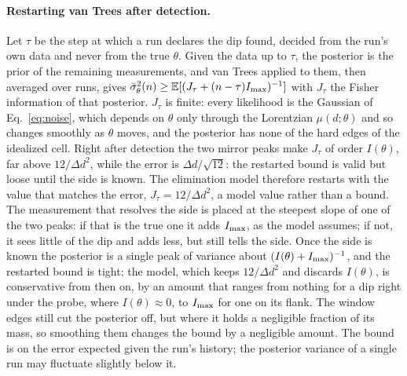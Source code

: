 \paragraph{Restarting van Trees after detection.} Let $\tau$ be the step at which a run declares the dip found,
decided from the run's own data and never from the true $\theta$. Given the data up to $\tau$, the posterior is the
prior of the remaining measurements, and van Trees applied to them, then averaged over runs, gives
$\bar\sigma_\theta^2(n)\ge\mathbb E[(J_\tau+(n-\tau)I_{\rm max})^{-1}]$ with $J_\tau$ the Fisher information of that
posterior. $J_\tau$ is finite: every likelihood is the Gaussian of Eq.~\eqref{eq:noise}, which depends on $\theta$ only
through the Lorentzian $\mu(d;\theta)$ and so changes smoothly as $\theta$ moves, and the posterior has
none of the hard edges of the idealized cell. Right after detection the two mirror peaks make $J_\tau$ of order $I(\theta)$, far above
$12/\Delta d^2$, while the error is $\Delta d/\sqrt{12}$: the restarted bound is valid but loose until the side is
known. The elimination model therefore restarts with the value that matches the error, $J_\tau=12/\Delta d^2$, a
model value rather than a bound. The measurement that resolves the side is placed at the steepest slope of one of
the two peaks: if that is the true one it adds $I_{\rm max}$, as the model assumes; if not, it sees little of the dip
and adds less, but still tells the side. Once the side is known the posterior is a single peak of variance about
$(I(\theta)+I_{\rm max})^{-1}$, and the restarted bound is tight; the model, which keeps $12/\Delta d^2$ and
discards $I(\theta)$, is conservative from then on, by an amount that ranges from nothing for a dip right under the
probe, where $I(\theta)\approx0$, to $I_{\rm max}$ for one on its flank. The window edges still cut the posterior
off, but where it holds a negligible fraction of its mass, so smoothing them changes the bound by a negligible
amount. The bound is on the error expected given the run's history; the posterior variance of a single run may
fluctuate slightly below it.
